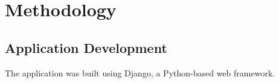 
\chapter{Methodology}  %


\section{Application Development} %
    
    The application was built using Django, a Python-based web framework.


